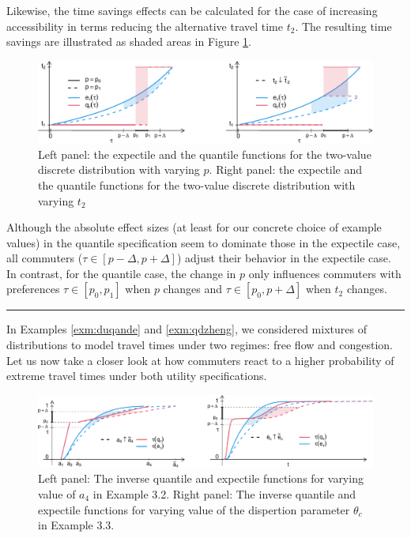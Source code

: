 \documentclass[preprint, 3p, authoryear]{elsarticle} %
\theoremstyle{definition}
\theoremstyle{definition}
\theoremstyle{definition}
\theoremstyle{definition}
\theoremstyle{remark}
\begin{document}
Likewise, the time savings effects can be calculated for the case of increasing accessibility in terms reducing the alternative travel time \(t_2\). The resulting time savings are illustrated as shaded areas in Figure \ref{fig:figex12}.

\begin{figure}
\includegraphics[width=1\linewidth]{traffic-expectiles_files/figure-latex/figex12-1} \caption{Left panel: the expectile and the quantile functions for the two-value discrete distribution with varying $p$. Right panel: the expectile and the quantile functions for the two-value discrete distribution with varying $t_2$}\label{fig:figex12}
\end{figure}

Although the absolute effect sizes (at least for our concrete choice of example values) in the quantile specification seem to dominate those in the expectile case, all commuters (\(\tau\in[p-\Delta,p+\Delta]\)) adjust their behavior in the expectile case. In contrast, for the quantile case, the change in \(p\) only influences commuters with preferences \(\tau\in[p_0,p_1]\) when \(p\) changes and \(\tau\in[p_0,p+\Delta]\) when \(t_2\) changes.

\begin{center}\rule{0.5\linewidth}{0.5pt}\end{center}

In Examples \ref{exm:duqande} and \ref{exm:qdzheng}, we considered mixtures of distributions to model travel times under two regimes: free flow and congestion. Let us now take a closer look at how commuters react to a higher probability of extreme travel times under both utility specifications.

\begin{figure}
\includegraphics[width=1\linewidth]{traffic-expectiles_files/figure-latex/figexp22-1} \caption{Left panel: The inverse quantile and expectile functions for varying value of $a_4$ in Example 3.2. Right panel: The inverse quantile and expectile functions for varying value of the dispertion parameter $\theta_c$ in Example 3.3.}\label{fig:figexp22}
\end{figure}
\end{document}
